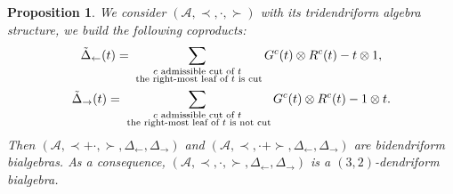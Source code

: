 \documentclass[10pt,a4paper]{amsart}
\numberwithin{equation}{section}
\theoremstyle{definition}
\theoremstyle{plain}
\newtheorem{Prop}[defi]{Proposition}
\begin{document}
\begin{Prop}\label{Prop:troideuxEg}
	We consider $(\mathcal{A},\prec,\cdot,\succ)$ with its tridendriform algebra structure, we build the following coproducts:
	\begin{gather*}
		\tilde{\Delta}_{\leftarrow}(t)=\sum_{\substack{c \text{ \normalfont admissible cut of }t \\ \text{ \normalfont the right-most leaf of $t$ is cut}}} G^c(t)\otimes R^c(t)-t\otimes 1, \\
		\tilde{\Delta}_{\rightarrow}(t)=\sum_{\substack{c \text{ \normalfont admissible cut of }t \\ \text{ \normalfont the right-most leaf of $t$ is not cut}}} G^c(t)\otimes R^c(t) -1\otimes t.
	\end{gather*}
	Then $(\mathcal{A},\prec+\cdot,\succ,\Delta_{\leftarrow},\Delta_{\rightarrow})$ and $(\mathcal{A},\prec,\cdot+\succ,\Delta_{\leftarrow},\Delta_{\rightarrow})$ are bidendriform bialgebras. As a consequence, $(\mathcal{A},\prec,\cdot,\succ,\Delta_{\leftarrow},\Delta_{\rightarrow})$ is a $(3,2)$-dendriform bialgebra.
\end{Prop}
\end{document}

